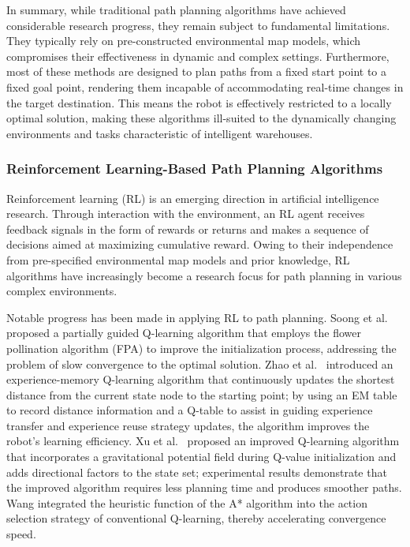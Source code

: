 In summary, while traditional path planning algorithms have achieved considerable research progress, they remain subject to fundamental limitations. They typically rely on pre-constructed environmental map models, which compromises their effectiveness in dynamic and complex settings. Furthermore, most of these methods are designed to plan paths from a fixed start point to a fixed goal point, rendering them incapable of accommodating real-time changes in the target destination. This means the robot is effectively restricted to a locally optimal solution, making these algorithms ill-suited to the dynamically changing environments and tasks characteristic of intelligent warehouses.

\subsubsection{Reinforcement Learning-Based Path Planning Algorithms}

Reinforcement learning (RL) is an emerging direction in artificial intelligence research. Through interaction with the environment, an RL agent receives feedback signals in the form of rewards or returns and makes a sequence of decisions aimed at maximizing cumulative reward. Owing to their independence from pre-specified environmental map models and prior knowledge, RL algorithms have increasingly become a research focus for path planning in various complex environments.

Notable progress has been made in applying RL to path planning. Soong et al.\ \cite{ref21} proposed a partially guided Q-learning algorithm that employs the flower pollination algorithm (FPA) to improve the initialization process, addressing the problem of slow convergence to the optimal solution. Zhao et al.\ \cite{ref22} introduced an experience-memory Q-learning algorithm that continuously updates the shortest distance from the current state node to the starting point; by using an EM table to record distance information and a Q-table to assist in guiding experience transfer and experience reuse strategy updates, the algorithm improves the robot's learning efficiency. Xu et al.\ \cite{ref23} proposed an improved Q-learning algorithm that incorporates a gravitational potential field during Q-value initialization and adds directional factors to the state set; experimental results demonstrate that the improved algorithm requires less planning time and produces smoother paths. Wang \cite{ref24} integrated the heuristic function of the A* algorithm into the action selection strategy of conventional Q-learning, thereby accelerating convergence speed.

